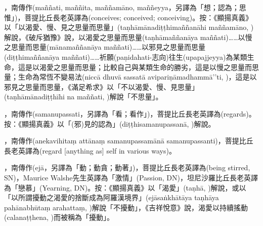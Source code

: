 \startitemgroup[noteitems]
\item{}，南傳作(maññati, maññita, maññamāno, maññeyya，另譯為「想；認為；思惟」)，菩提比丘長老英譯為(conceives; conceived; conceiving)。按：《顯揚真義》以「以渴愛、慢、見之思量而思量」(taṇhāmānadiṭṭhimaññanāhi maññamāno, )解說，《破斥猶豫》說，以渴愛之思量而思量(taṇhāmaññanāya maññati)……以慢之思量而思量(mānamaññanāya maññati)……以邪見之思量而思量(diṭṭhimaññanāya maññati)……祈願(paṇidahati-志向)往生(upapajjeyya)為某類生命，這是以渴愛之思量而思量；比較自己與某類生命的勝劣，這是以慢之思量而思量；生命為常恆不變易法(niccā dhuvā sassatā avipariṇāmadhammā’’ti, )，這是以邪見之思量而思量，《滿足希求》以「不以渴愛、慢、見思量」(taṇhāmānadiṭṭhīhi na maññati, )解說「不思量」。
\stopitemgroup

\startitemgroup[noteitems]
\item{}，南傳作(samanupassati，另譯為「看；看作」)，菩提比丘長老英譯為(regards)。按：《顯揚真義》以「(邪)見的認為」(diṭṭhisamanupassanā, )解說。
\item{}，南傳作(anekavihitaṃ attānaṃ samanupassamānā samanupassanti)，菩提比丘長老英譯為(regard [anything as] self in various ways)。
\stopitemgroup

\startitemgroup[noteitems]
\item{}，南傳作(ejā，另譯為「動；動貪；動著」)，菩提比丘長老英譯為(being stirred, SN)，Maurice Walshe先生英譯為「激情」(Passion, DN)，坦尼沙羅比丘長老英譯為「戀慕」(Yearning, DN)。按：《顯揚真義》以「渴愛」(taṇhā, )解說，或以「以所謂擾動之渴愛的捨斷成為阿羅漢境界」(ejāsaṅkhātāya taṇhāya pahānabhūtaṃ arahattaṃ, )解說「不擾動」，《吉祥悅意》說，渴愛以持續搖動(calanaṭṭhena, )而被稱為「擾動」。
\stopitemgroup

